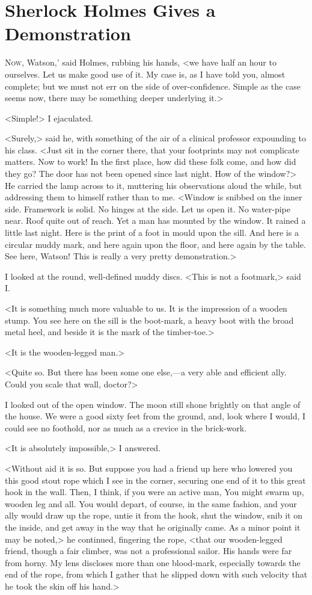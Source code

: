 \chapter{Sherlock Holmes Gives a Demonstration}
\lettrine[ante=`]{N}{ow}, Watson,' said Holmes, rubbing his hands, <we have half an hour to ourselves. Let us make good use of it. My case is, as I have told you, almost complete; but we must not err on the side of over-confidence. Simple as the case seems now, there may be something deeper underlying it.>

<Simple!> I ejaculated.

<Surely,> said he, with something of the air of a clinical professor expounding to his class. <Just sit in the corner there, that your footprints may not complicate matters. Now to work! In the first place, how did these folk come, and how did they go? The door has not been opened since last night. How of the window?> He carried the lamp across to it, muttering his observations aloud the while, but addressing them to himself rather than to me. <Window is snibbed on the inner side. Framework is solid. No hinges at the side. Let us open it. No water-pipe near. Roof quite out of reach. Yet a man has mounted by the window. It rained a little last night. Here is the print of a foot in mould upon the sill. And here is a circular muddy mark, and here again upon the floor, and here again by the table. See here, Watson! This is really a very pretty demonstration.>

I looked at the round, well-defined muddy discs. <This is not a footmark,> said I\@.

<It is something much more valuable to us. It is the impression of a wooden stump. You see here on the sill is the boot-mark, a heavy boot with the broad metal heel, and beside it is the mark of the timber-toe.>

<It is the wooden-legged man.>

<Quite so. But there has been some one else,—a very able and efficient ally. Could you scale that wall, doctor?>

I looked out of the open window. The moon still shone brightly on that angle of the house. We were a good sixty feet from the ground, and, look where I would, I could see no foothold, nor as much as a crevice in the brick-work.

<It is absolutely impossible,> I answered.

<Without aid it is so. But suppose you had a friend up here who lowered you this good stout rope which I see in the corner, securing one end of it to this great hook in the wall. Then, I think, if you were an active man, You might swarm up, wooden leg and all. You would depart, of course, in the same fashion, and your ally would draw up the rope, untie it from the hook, shut the window, snib it on the inside, and get away in the way that he originally came. As a minor point it may be noted,> he continued, fingering the rope, <that our wooden-legged friend, though a fair climber, was not a professional sailor. His hands were far from horny. My lens discloses more than one blood-mark, especially towards the end of the rope, from which I gather that he slipped down with such velocity that he took the skin off his hand.>

